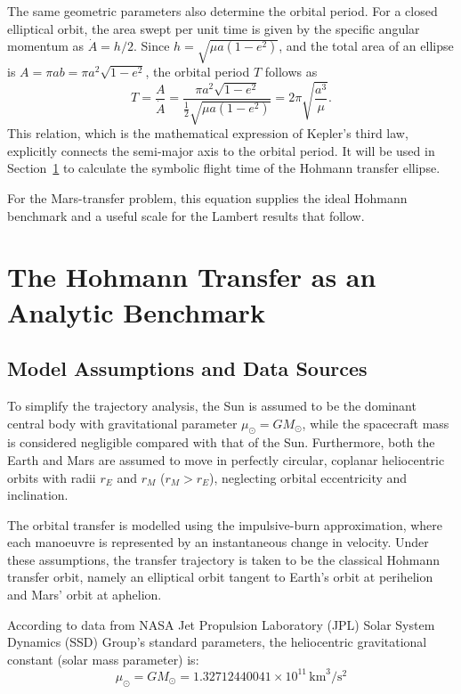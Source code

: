 \documentclass[11pt,a4paper]{article}
\begin{document}
The same geometric parameters also determine the orbital period. For a closed elliptical orbit, the area swept per unit time is given by the specific angular momentum as \(\dot{A} = h/2\). Since \(h = \sqrt{\mu a(1-e^2)}\), and the total area of an ellipse is \(A = \pi a b = \pi a^2 \sqrt{1-e^2}\), the orbital period \(T\) follows as
\begin{equation}
  T = \frac{A}{\dot{A}} = \frac{\pi a^2 \sqrt{1-e^2}}{\frac{1}{2}\sqrt{\mu a(1-e^2)}} = 2\pi\sqrt{\frac{a^3}{\mu}}.
  \label{eq:kepler-third-law}
\end{equation}
This relation, which is the mathematical expression of Kepler's third law, explicitly connects the semi-major axis to the orbital period. It will be used in Section~\ref{sec:hohmann-benchmark} to calculate the symbolic flight time of the Hohmann transfer ellipse.

For the Mars-transfer problem, this equation supplies the ideal Hohmann benchmark and a useful scale for the Lambert results that follow.

\section{The Hohmann Transfer as an Analytic Benchmark}
\label{sec:hohmann-benchmark}

\subsection{Model Assumptions and Data Sources}
To simplify the trajectory analysis, the Sun is assumed to be the dominant
central body with gravitational parameter $\mu_\odot=GM_\odot$, while the
spacecraft mass is considered negligible compared with that of the Sun.
Furthermore, both the Earth and Mars are assumed to move in perfectly
circular, coplanar heliocentric orbits with radii $r_E$ and $r_M$
($r_M>r_E$), neglecting orbital eccentricity and inclination.

The orbital transfer is modelled using the impulsive-burn approximation,
where each manoeuvre is represented by an instantaneous change in velocity.
Under these assumptions, the transfer trajectory is taken to be the
classical Hohmann transfer orbit, namely an elliptical orbit tangent to
Earth's orbit at perihelion and Mars' orbit at aphelion.

According to data from NASA Jet Propulsion Laboratory (JPL) Solar System Dynamics (SSD) Group's standard parameters\cite{jplAstroPar}, the heliocentric gravitational constant (solar mass parameter) is:
\begin{equation}
    \mu_{\odot} = G M_{\odot} = 1.32712440041 \times 10^{11} \, \text{km}^3/\text{s}^2
\end{equation}
\end{document}
